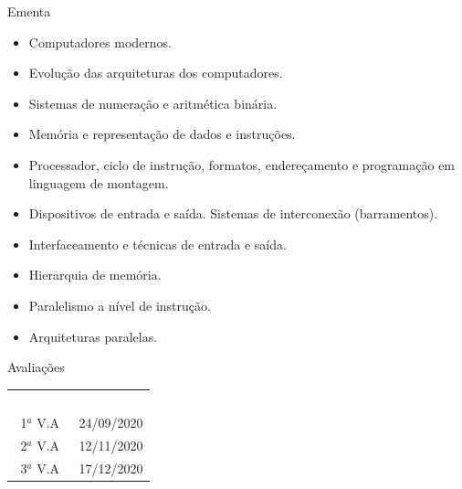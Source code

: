 \documentclass[aspectratio=169,
				xcolor=table]{beamer}
\begin{document}
	\begin{frame}[allowframebreaks]{Ementa}
		\begin{itemize}
			\item Computadores modernos. 
			\vspace{0.75em}
			\item Evolução das arquiteturas dos computadores.
			\vspace{0.75em}
			\item  Sistemas de numeração e aritmética binária. 
			\vspace{0.75em}
			\item Memória e representação de dados e instruções.
			\vspace{0.75em}
			\item  Processador, ciclo de instrução, formatos, endereçamento e programação em linguagem de montagem.
			\vspace{0.75em}
			\item  Dispositivos de entrada e saída. Sistemas de interconexão (barramentos).
			\vspace{0.75em}
			\item  Interfaceamento e técnicas de entrada e saída.
			\vspace{0.75em}
			\item  Hierarquia de memória. 
			\vspace{0.75em}
			\item Paralelismo a nível de instrução. 
			\vspace{0.75em}
			\item Arquiteturas paralelas.
		\end{itemize}
	\end{frame}
	
	\begin{frame}{Avaliações}
		\begin{eftable}
			\LARGE
			\begin{tabular}{c | c}
				\textcolor{white}{Avaliação} & 
				\textcolor{white}{Data} \\
				1${}^a$ V.A & 24/09/2020 \\
				2${}^a$ V.A & 12/11/2020 \\
				3${}^a$ V.A & 17/12/2020 \\			
			\end{tabular}
		\end{eftable}
	\end{frame}	
	
\end{document}
